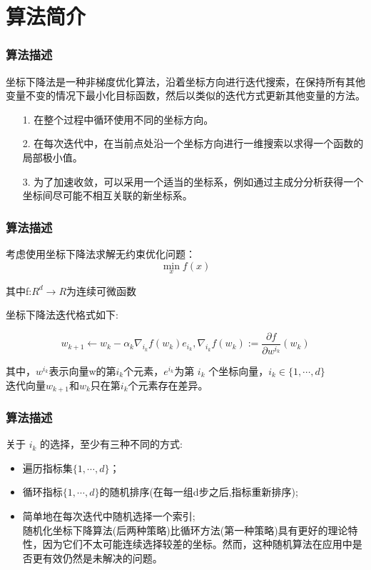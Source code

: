 \documentclass[10pt]{beamer}
\begin{document}
\section{算法简介}
\begin{frame}
\frametitle{算法描述}
坐标下降法是一种非梯度优化算法，沿着坐标方向进行迭代搜索，在保持所有其他变量不变的情况下最小化目标函数，然后以类似的迭代方式更新其他变量的方法。
\bigskip
\begin{itemize}
	\item[1.] 在整个过程中循环使用不同的坐标方向。
	\item[2.] 在每次迭代中，在当前点处沿一个坐标方向进行一维搜索以求得一个函数的局部极小值。
	\item[3.] 为了加速收敛，可以采用一个适当的坐标系，例如通过主成分分析获得一个坐标间尽可能不相互关联的新坐标系。
\end{itemize}
\end{frame}
\begin{frame}
	\frametitle{算法描述}
	考虑使用坐标下降法求解无约束优化问题：
	$$
	\min_{x}f(x)
	$$
	
	其中f:$R^{d}→R$为连续可微函数
	
	坐标下降法迭代格式如下:
	
	$$
	w_{k+1}\gets w_{k}-\alpha_{k}\nabla_{i_{k}}f(w_{k})e_{i_{k}},\nabla_{i_{k}}f(w_{k}):=\frac{\partial f}{\partial w^{i_{k}}}(w_{k})
	$$
	
	其中，$w^{{i}_{k}}$表示向量w的第$i_{k}$个元素，$e^{{i}_{k}}$为第 $i_{k}$ 个坐标向量，$i_{k}\in\{1,\cdots,d\}$ \\
	迭代向量$w_{k+1}$和$w_{k}$只在第$i_{k}$个元素存在差异。
	\end{frame}
\begin{frame}
	\frametitle{算法描述}
	关于 $i_{k}$ 的选择，至少有三种不同的方式:
	\begin{itemize}
		\item 遍历指标集$\{1,\cdots,d\}$；
		\item 循环指标$\{1,\cdots,d\}$的随机排序(在每一组d步之后,指标重新排序);
		\item 简单地在每次迭代中随机选择一个索引;\\
	
	随机化坐标下降算法(后两种策略)比循环方法(第一种策略)具有更好的理论特性，因为它们不太可能连续选择较差的坐标。然而，这种随机算法在应用中是否更有效仍然是未解决的问题。
	\end{itemize}
	
	
\end{frame}
\end{document}
